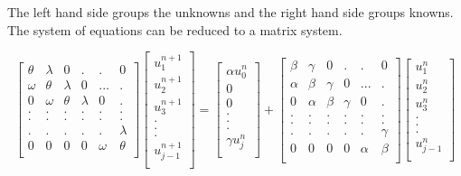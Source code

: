 \documentclass[12pt, oneside]{book}
\theoremstyle{plain}
\theoremstyle{definition}
\begin{document}
The left hand side groups the unknowns and the right hand side groups knowns. The system of equations can be  reduced to a matrix system.

$$
\begin{bmatrix}  
\theta & \lambda & 0 & . & . & 0 \\ 
\omega & \theta & \lambda & 0 & ... & . \\ 
0 & \omega & \theta & \lambda & 0 & . \\ 
. & . & .  & . & . & . \\ 
. & . & .  & . & . & . \\ 
. & . & .  & . & . & \lambda \\ 
0 & 0 & 0 & 0 & \omega & \theta \\ 
\end{bmatrix}  \begin{bmatrix} 
u_{1}^{n + 1} \\ 
u_{2}^{n + 1} \\ 
u_{3}^{n + 1} \\ 
.\\ 
.\\ 
.\\ 
u_{j - 1}^{n + 1}\\ 
\end{bmatrix}= \begin{bmatrix}
\alpha u_{0}^{n} \\ 
0 \\ 
0 \\ 
.\\ 
.\\ 
.\\ 
\gamma u_{j}^{n} \\ 
\end{bmatrix}  + \begin{bmatrix}  
\beta & \gamma & 0 & . & . & 0 \\ 
\alpha & \beta & \gamma & 0 & ... & . \\ 
0 & \alpha & \beta & \gamma & 0 & . \\ 
. & . & .  & . & . & . \\ 
. & . & .  & . & . & . \\ 
. & . & .  & . & . & \gamma \\ 
0 & 0 & 0 & 0 & \alpha & \beta \\ 
\end{bmatrix} \begin{bmatrix}  
u_{1}^{n} \\ 
u_{2}^{n} \\ 
u_{3}^{n} \\ 
.\\ 
.\\ 
.\\ 
u_{j - 1}^{n} \\ 
\end{bmatrix}
$$
\end{document}
